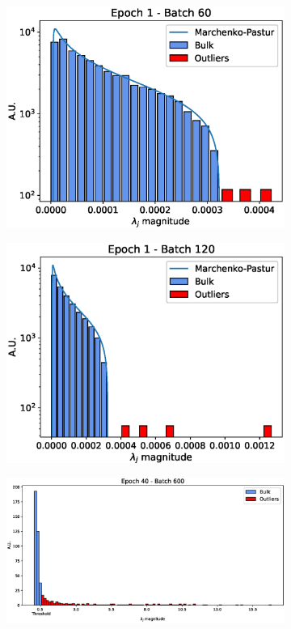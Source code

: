 \documentclass{revtex4-1}
\begin{document}
\begin{figure}
\begin{subfigure}{.32\linewidth}
    \includegraphics[width=\linewidth]{sv_distr_e1_b60.eps}
    \caption{}
    \label{fig:sv2}
  \end{subfigure}\par\medskip
  \begin{subfigure}{.32\linewidth}
    \includegraphics[width=\linewidth]{sv_distr_e1_b120.eps}
    \caption{} 
    \label{fig:sv3}
  \end{subfigure}
  \begin{subfigure}{.64\linewidth}
    \includegraphics[width=\linewidth]{sv_distr_e40_b600.eps}

\end{subfigure}
\end{figure}
\end{document}
